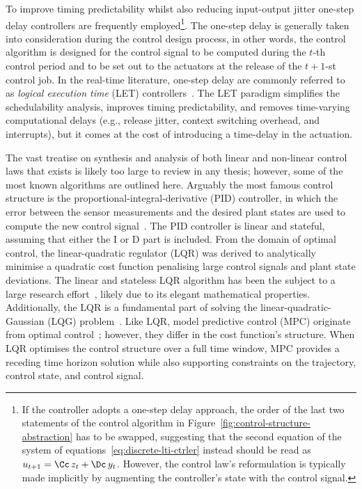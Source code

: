 To improve timing predictability whilst also reducing input-output jitter one-step delay controllers are frequently employed\footnote{If the controller adopts a one-step delay approach, the order of the last two statements of the control algorithm in Figure~\ref{fig:control-structure-abstraction} has to be swapped, suggesting that the second equation of the system of equations~\eqref{eq:discrete-lti-ctrler} instead should be read as $u_{t+1} = \Cc\,z_t+\Dc\,y_t$. However, the control law's reformulation is typically made implicitly by augmenting the controller's state with the control signal.}.
The one-step delay is generally taken into consideration during the control design process, in other words, the control algorithm is designed for the control signal to be computed during the $t$-th control period and to be set out to the actuators at the release of the $t+1$-st control job.
In the real-time literature, one-step delay are commonly referred to as \emph{logical execution time} (LET) controllers~\cite{Ernst:2018, Gemlau:2021, Kirsch:2012}.
The LET paradigm simplifies the schedulability analysis, improves timing predictability, and removes time-varying computational delays (e.g., release jitter, context switching overhead, and interrupts), but it comes at the cost of introducing a time-delay in the actuation.

The vast treatise on synthesis and analysis of both linear and non-linear control laws that exists is likely too large to review in any thesis; however, some of the most known algorithms are outlined here.
Arguably the most famous control structure is the proportional-integral-derivative (PID) controller, in which the error between the sensor measurements and the desired plant states are used to compute the new control signal~\cite{Astrom:2006}.
The PID controller is linear and stateful, assuming that either the I or D part is included.
From the domain of optimal control, the linear-quadratic regulator (LQR) was derived to analytically minimise a quadratic cost function penalising large control signals and plant state deviations.
The linear and stateless LQR algorithm has been the subject to a large research effort~\addref{}, likely due to its elegant mathematical properties.
Additionally, the LQR is a fundamental part of solving the linear-quadratic-Gaussian (LQG) problem~\addref{}.
Like LQR, model predictive control (MPC) originate from optimal control~\addref{}; however, they differ in the cost function's structure.
When LQR optimises the control structure over a full time window, MPC provides a receding time horizon solution while also supporting constraints on the trajectory, control state, and control signal.

